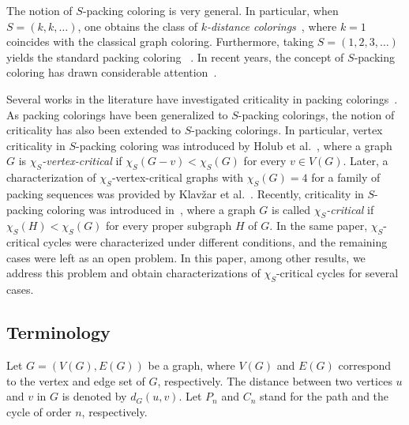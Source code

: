 \documentclass[12pt]{article}
\begin{document}
The notion of $S$-packing coloring is very general. In particular, when 
$S=(k,k,\ldots)$, one obtains the class of \emph{$k$-distance colorings}~\cite{kramer-2008}, where $k=1$ coincides with the  classical graph coloring. 
Furthermore, taking $S=(1,2,3,\ldots)$ yields the standard packing coloring ~\cite{Goddard, Bresar2}. In recent years, the concept of $S$-packing coloring has drawn considerable attention~\cite{bresar-2025, bresar-2025b, elzain-2025+, holub-2023, kostochka-2021, liu-2020, mortada-2024, mortada-2025, mortada-2026, yang-2023}. 


Several works in the literature have investigated criticality in packing colorings~\cite{klavzar-2019, bresar-2022, ferme-2022}. As packing colorings have been generalized to $S$-packing colorings, the notion of criticality has also been extended to $S$-packing colorings. In particular, vertex criticality in $S$-packing coloring was introduced by Holub et al.~\cite{holub-2020}, where a graph $G$ is \emph{$\chi_S$-vertex-critical} if $\chi_S(G-v) < \chi_S(G)$ for every $v \in V(G)$. Later, a characterization of $\chi_S$-vertex-critical graphs with $\chi_S(G)=4$ for a family of packing sequences was provided by Klav\v{z}ar et al.~\cite{klavzar-2023}. Recently, criticality in $S$-packing coloring was introduced in~\cite{ekinci-2026}, where a graph $G$ is called \emph{$\chi_S$-critical} if $\chi_S(H) < \chi_S(G)$ 
for every proper subgraph $H$ of $G$. In the same paper, $\chi_S$-critical cycles were characterized under different conditions, 
and the remaining cases were left as an open problem. In this paper, among other results, we address this problem and obtain characterizations of $\chi_S$-critical cycles for several cases.


\subsection{Terminology}
Let  $G=(V(G), E(G))$ be a graph, where $V(G)$ and $E(G)$ correspond to the vertex and edge set of $G$, respectively. The distance between two vertices $u$ and $v$ in  $G$ is denoted by $d_G(u,v)$.
 Let $P_n$ and $C_n$ stand for the path and the cycle of order $n$, respectively.
\end{document}
